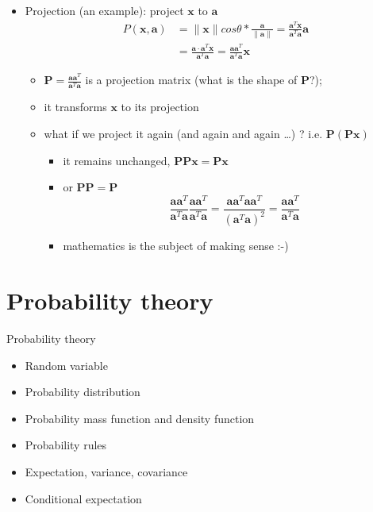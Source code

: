 \documentclass[ignorenonframetext,]{beamer}
\providecommand{\tightlist}{%
  \setlength{\itemsep}{0pt}\setlength{\parskip}{0pt}}
\newcommand{\vv}[1]{\boldsymbol{#1}}
\begin{document}
\begin{frame}{}
\protect\hypertarget{section-3}{}

\begin{itemize}
\tightlist
\item
  Projection (an example): project \(\vv{x}\) to \(\vv{a}\)
  \begin{align*}P(\vv{x}, \vv{a}) &= \|\vv{x}\|cos \theta * \frac{\vv{a}}{\|\vv{a}\|} =  \frac{\vv{a}^T\vv{x}}{\vv{a}^T\vv{a}}  \vv{a} \\
  &= \frac{\vv{a}\cdot \vv{a}^T\vv{x}}{\vv{a}^T\vv{a}} = \frac{\vv{a}\vv{a}^T}{\vv{a}^{T}\vv{a}}\vv{x}\end{align*}

  \begin{itemize}
  \tightlist
  \item
    \(\vv{P} = \frac{\vv{a}\vv{a}^T}{\vv{a}^{T}\vv{a}}\) is a projection
    matrix (what is the shape of \(\vv{P}\)?);
  \item
    it transforms \(\vv{x}\) to its projection
  \item
    what if we project it again (and again and again \ldots{}) ? i.e.
    \(\vv{P}(\vv{P}\vv{x})\) \pause 

    \begin{itemize}
    \tightlist
    \item
      it remains unchanged, \(\vv{PP}\vv{x} = \vv{P}\vv{x}\)
    \item
      or \(\vv{P}\vv{P} = \vv{P}\)
      \[\frac{\vv{a}\vv{a}^T}{\vv{a}^{T}\vv{a}}\frac{\vv{a}\vv{a}^T}{\vv{a}^{T}\vv{a}}= \frac{\vv{aa}^T\vv{aa}^T}{(\vv{a}^T\vv{a})^2}= \frac{\vv{a}\vv{a}^T}{\vv{a}^{T}\vv{a}}\]
    \item
      mathematics is the subject of making sense :-)
    \end{itemize}
  \end{itemize}
\end{itemize}

\end{frame}

\hypertarget{probability-theory}{%
\section{Probability theory}\label{probability-theory}}

\begin{frame}{Probability theory}
\protect\hypertarget{probability-theory-1}{}

\begin{itemize}
\tightlist
\item
  Random variable \bigskip
\item
  Probability distribution \bigskip
\item
  Probability mass function and density function \bigskip
\item
  Probability rules \bigskip
\item
  Expectation, variance, covariance \bigskip
\item
  Conditional expectation
\end{itemize}

\end{frame}
\end{document}
